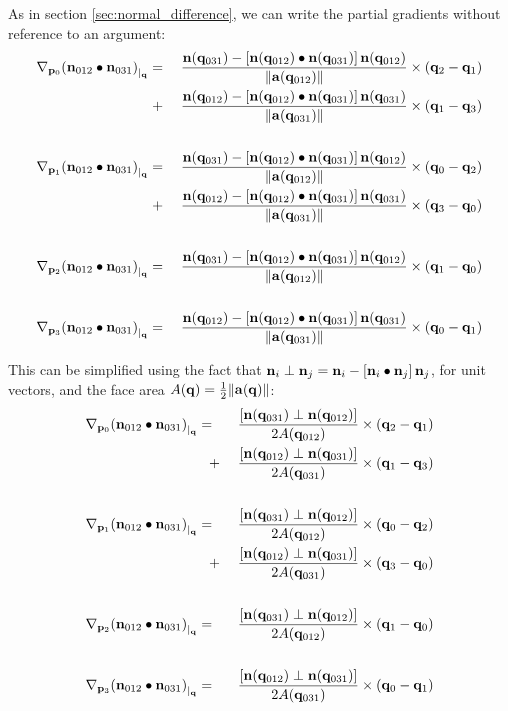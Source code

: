 As in section \ref{sec:normal_difference}, we can write the partial gradients
without reference to an argument:
\begin{eqnarray}
\label{eq:normal_dot_gradient}
\Gc{\p_0}{(\n_{012} \bullet \n_{031})}{\q}
& = \; &
{ { \n(\q_{031}) - \left[ \n(\q_{012}) \bullet \n(\q_{031}) \right] \n(\q_{012}) }
\over {\| \a (\q_{012}) \| } }
\times (\q_2 - \q_1)
\\
& \; + &
{ { \n(\q_{012}) - \left[ \n(\q_{012}) \bullet \n(\q_{031}) \right] \n(\q_{031})  }
\over {\| \a (\q_{031}) \| }}
\times (\q_1 - \q_3)
\nonumber \\
& & \nonumber \\
\Gc{\p_1}{(\n_{012} \bullet \n_{031})}{\q}
& = \; &
{ { \n(\q_{031}) - \left[ \n(\q_{012}) \bullet \n(\q_{031}) \right] \n(\q_{012})  }
\over {\| \a (\q_{012}) \| } }
\times (\q_0 - \q_2)
\nonumber \\
& \; + &
{{ \n(\q_{012}) - \left[ \n(\q_{012}) \bullet \n(\q_{031}) \right] \n(\q_{031})   }
\over {\| \a (\q_{031}) \| }}
\times (\q_3 - \q_0)
\nonumber \\
& & \nonumber \\
\Gc{\p_2}{(\n_{012} \bullet \n_{031})}{\q}
& = \; &
{{ \n(\q_{031}) - \left[ \n(\q_{012}) \bullet \n(\q_{031}) \right] \n(\q_{012})  }
\over {\| \a (\q_{012}) \| } }
\times (\q_1 - \q_0)
\nonumber \\
& & \nonumber \\
\Gc{\p_3}{(\n_{012} \bullet \n_{031})}{\q}
& = \; &
{ { \n(\q_{012}) - \left[ \n(\q_{012}) \bullet \n(\q_{031}) \right] \n(\q_{031}) }
\over {\| \a (\q_{031}) \| } }
\times (\q_0 - \q_1)
\nonumber
\end{eqnarray}

This can be simplified using the fact that
\({\mathbf n}_i \perp {\mathbf n}_j = {\mathbf n}_i - \left[ {\mathbf n}_i \bullet {\mathbf n}_j \right] {\mathbf n}_j\), for unit vectors,
and the face area \(A({\mathbf q}) = \frac{1}{2} \| {\mathbf a}({\mathbf q}) \|\):
\begin{eqnarray}
\label{eq:simplified_normal_dot_gradient}
\Gc{\p_0}{(\n_{012} \bullet \n_{031})}{\q}
& = \;\;\; &
\frac{\left[ \n(\q_{031}) \perp \n(\q_{012}) \right]}{2A(\q_{012})}
\times (\q_2 - \q_1)
\\
& \;\;\; + &
\frac{\left[ \n(\q_{012}) \perp \n(\q_{031}) \right]}{2A(\q_{031})}
\times (\q_1 - \q_3)
\nonumber \\
& & \nonumber \\
\Gc{\p_1}{(\n_{012} \bullet \n_{031})}{\q}
& = \;\;\; &
\frac{\left[ \n(\q_{031}) \perp \n(\q_{012}) \right]}{2A(\q_{012})}
\times (\q_0 - \q_2)
\nonumber \\
& \;\;\; + &
\frac{\left[ \n(\q_{012}) \perp \n(\q_{031}) \right]}{2A(\q_{031})}
\times (\q_3 - \q_0)
\nonumber \\
& & \nonumber \\
\Gc{\p_2}{(\n_{012} \bullet \n_{031})}{\q}
& = \;\;\; &
\frac{\left[ \n(\q_{031}) \perp \n(\q_{012}) \right]}{2A(\q_{012})}
\times (\q_1 - \q_0)
\nonumber \\
& & \nonumber \\
\Gc{\p_3}{(\n_{012} \bullet \n_{031})}{\q}
& = \;\;\; &
\frac{\left[ \n(\q_{012}) \perp \n(\q_{031}) \right]}{2A(\q_{031})}
\times (\q_0 - \q_1)
\nonumber
\end{eqnarray}

